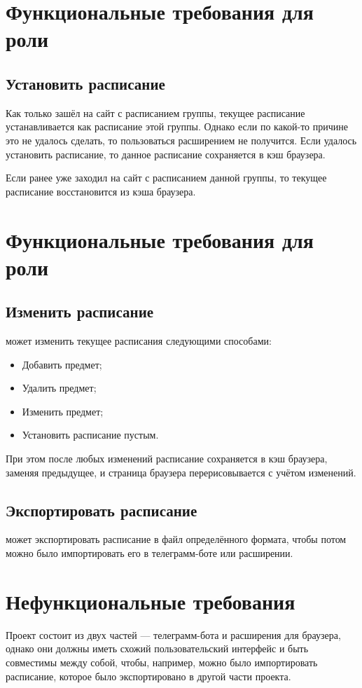 	\section{Функциональные требования для роли }
		\subsection{Установить расписание}
			Как только  зашёл на сайт с расписанием группы, текущее расписание устанавливается как расписание этой группы. Однако если по какой-то причине это не удалось сделать, то пользоваться расширением не получится. Если удалось установить расписание, то данное расписание сохраняется в кэш браузера.
			
			Если  ранее уже заходил на сайт с расписанием данной группы, то текущее расписание восстановится из кэша браузера.
	\section{Функциональные требования для роли }
		\subsection{Изменить расписание}
			  может изменить текущее расписания следующими способами:
			\begin{itemize}
				\item Добавить предмет;
				
				\item Удалить предмет;
				
				\item Изменить предмет;
				
				\item Установить расписание пустым.
			\end{itemize}
			
			При этом после любых изменений расписание сохраняется в кэш браузера, заменяя предыдущее, и страница браузера перерисовывается с учётом изменений.
		\subsection{Экспортировать расписание}
			 может экспортировать расписание в файл определённого формата, чтобы потом можно было импортировать его в телеграмм-боте или расширении.
	\section{Нефункциональные требования}
		Проект состоит из двух частей --- телеграмм-бота и расширения для браузера, однако они должны иметь схожий пользовательский интерфейс и быть совместимы между собой, чтобы, например, можно было импортировать расписание, которое было экспортировано в другой части проекта.
